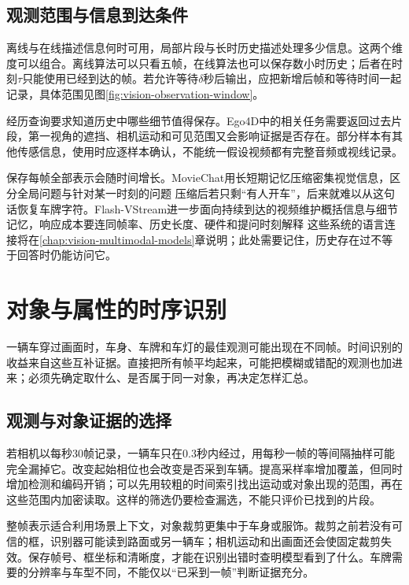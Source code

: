 \subsection{观测范围与信息到达条件}
\label{sec:vision-video-availability}

离线与在线描述信息何时可用，局部片段与长时历史描述处理多少信息。这两个维度可以组合。离线算法可以只看五帧，在线算法也可以保存数小时历史；后者在时刻$\tau$只能使用已经到达的帧。若允许等待$\delta$秒后输出，应把新增后帧和等待时间一起记录，具体范围见图\ref{fig:vision-observation-window}。

经历查询要求知道历史中哪些细节值得保存。Ego4D中的相关任务需要返回过去片段，第一视角的遮挡、相机运动和可见范围又会影响证据是否存在。部分样本有其他传感信息，使用时应逐样本确认，不能统一假设视频都有完整音频或视线记录。

保存每帧全部表示会随时间增长。MovieChat用长短期记忆压缩密集视觉信息，区分全局问题与针对某一时刻的问题 压缩后若只剩“有人开车”，后来就难以从这句话恢复车牌字符。Flash-VStream进一步面向持续到达的视频维护概括信息与细节记忆，响应成本要连同帧率、历史长度、硬件和提问时刻解释 这些系统的语言连接将在\ref{chap:vision-multimodal-models}章说明；此处需要记住，历史存在过不等于回答时仍能访问它。

\section{对象与属性的时序识别}
\label{sec:vision-video-object-recognition}

一辆车穿过画面时，车身、车牌和车灯的最佳观测可能出现在不同帧。时间识别的收益来自这些互补证据。直接把所有帧平均起来，可能把模糊或错配的观测也加进来；必须先确定取什么、是否属于同一对象，再决定怎样汇总。

\subsection{观测与对象证据的选择}
\label{sec:vision-video-evidence-selection}

若相机以每秒30帧记录，一辆车只在0.3秒内经过，用每秒一帧的等间隔抽样可能完全漏掉它。改变起始相位也会改变是否采到车辆。提高采样率增加覆盖，但同时增加检测和编码开销；可以先用较粗的时间索引找出运动或对象出现的范围，再在这些范围内加密读取。这样的筛选仍要检查漏选，不能只评价已找到的片段。

整帧表示适合利用场景上下文，对象裁剪更集中于车身或服饰。裁剪之前若没有可信的框，识别器可能读到路面或另一辆车；相机运动和出画面还会使固定裁剪失效。保存帧号、框坐标和清晰度，才能在识别出错时查明模型看到了什么。车牌需要的分辨率与车型不同，不能仅以“已采到一帧”判断证据充分。

